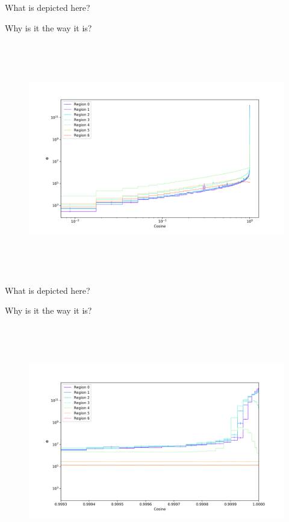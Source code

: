 What is depicted here?

Why is it the way it is?

\clearpage

%
\begin{figure}[htb]
\centering
\includegraphics[height=4in]{tex/figures/flux_rad_cos.png}
\caption[]{}
\label{fig:}
\end{figure}

What is depicted here?

Why is it the way it is?

\clearpage

%
\begin{figure}[htb]
\centering
\includegraphics[height=4in]{tex/figures/flux_rad_cos_detail.png}
\caption[]{}
\label{fig:}
\end{figure}

